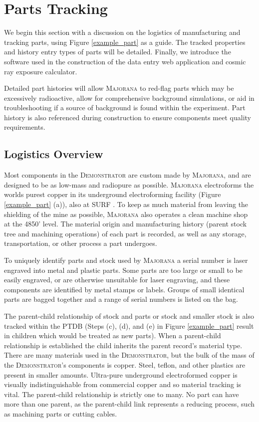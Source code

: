 \documentclass[journal]{IEEEtran}
\begin{document}
\section{Parts Tracking}
We begin this section with a discussion on the logistics of manufacturing and tracking parts, using Figure \ref{example_part}
as a guide. The tracked properties and history entry types of parts will be detailed. Finally, we introduce the
software used in the construction of the data entry web application and cosmic ray exposure calculator.

Detailed part histories will allow \textsc{Majorana}
to red-flag parts which may be excessively radioactive, allow for comprehensive background simulations,
or aid in troubleshooting if a source of background is found within the experiment.
Part history is also referenced during construction to ensure components meet quality requirements.

\subsection{Logistics Overview}
Most components in the \textsc{Demonstrator} are custom made by \textsc{Majorana}, and are designed
to be as low-mass and radiopure as possible. 
\textsc{Majorana} electroforms the worlds purest copper in its underground electroforming facility (Figure \ref{example_part} (a)), also at SURF \cite{mj_wilkerson}.
To keep as much material from leaving the shielding of the mine as possible, \textsc{Majorana} also operates a clean 
machine shop at the 4850' level. The material origin and manufacturing history (parent stock tree and machining operations) 
of each part is recorded, as well as any storage, transportation, or other process a part undergoes.

To uniquely identify parts and stock used by \textsc{Majorana} a serial number is laser engraved into metal and plastic parts.
Some parts are too large or small to be easily engraved, or are otherwise unsuitable for laser engraving, and these
components are identified by metal stamps or labels. Groups of small identical parts are bagged together
and a range of serial numbers is listed on the bag.

The parent-child relationship of stock and parts or stock and smaller stock is also tracked
within the PTDB (Steps (c), (d), and (e) in Figure \ref{example_part} result in children which would be treated as new parts).
When a parent-child relationship is established the child inherits the parent record's material type. 
There are many materials used in the \textsc{Demonstrator}, but the bulk of the mass of the \textsc{Demonstrator}'s components is copper.
Steel, teflon, and other plastics are present in smaller amounts. 
Ultra-pure underground electroformed copper is visually indistinguishable from commercial copper and so material
tracking is vital.
The parent-child relationship is strictly one to many. No part can have more than one parent, as the parent-child link
represents a reducing process, such as machining parts or cutting cables. 
\end{document}
